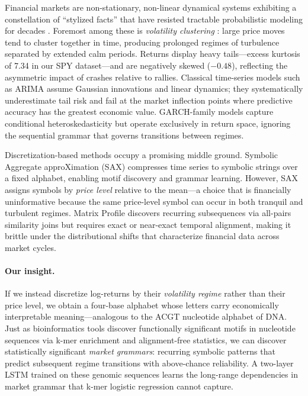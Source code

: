 \documentclass[11pt]{article}
\begin{document}
Financial markets are non-stationary, non-linear dynamical systems
exhibiting a constellation of ``stylized facts'' that have resisted
tractable probabilistic modeling for decades
\citep{cont2001empirical,mandelbrot1963variation}.  Foremost among
these is \emph{volatility clustering} \citep{engle1982autoregressive}:
large price moves tend to cluster together in time, producing prolonged
regimes of turbulence separated by extended calm periods.  Returns
display heavy tails---excess kurtosis of 7.34 in our SPY dataset---and
are negatively skewed ($-0.48$), reflecting the asymmetric impact of
crashes relative to rallies.  Classical time-series models such as
ARIMA \citep{box1970distribution} assume Gaussian innovations and linear
dynamics; they systematically underestimate tail risk and fail at the
market inflection points where predictive accuracy has the greatest
economic value.  GARCH-family models \citep{bollerslev1986generalized}
capture conditional heteroskedasticity but operate exclusively in return
space, ignoring the sequential grammar that governs transitions between
regimes.

Discretization-based methods occupy a promising middle ground.
Symbolic Aggregate approXimation (SAX) \citep{lin2003symbolic}
compresses time series to symbolic strings over a fixed alphabet,
enabling motif discovery and grammar learning.  However, SAX assigns
symbols by \emph{price level} relative to the mean---a choice that is
financially uninformative because the same price-level symbol can occur
in both tranquil and turbulent regimes.  Matrix Profile
\citep{yeh2016matrix} discovers recurring subsequences via all-pairs
similarity joins but requires exact or near-exact temporal alignment,
making it brittle under the distributional shifts that characterize
financial data across market cycles.

\paragraph{Our insight.}
If we instead discretize log-returns by their \emph{volatility regime}
rather than their price level, we obtain a four-base alphabet whose
letters carry economically interpretable meaning---analogous to the
ACGT nucleotide alphabet of DNA.  Just as bioinformatics tools
\citep{altschul1990basic,vinga2003alignment} discover functionally
significant motifs in nucleotide sequences via k-mer enrichment and
alignment-free statistics, we can discover statistically significant
\emph{market grammars}: recurring symbolic patterns that predict
subsequent regime transitions with above-chance reliability.  A
two-layer LSTM trained on these genomic sequences learns the long-range
dependencies in market grammar that k-mer logistic regression cannot
capture.
\end{document}
